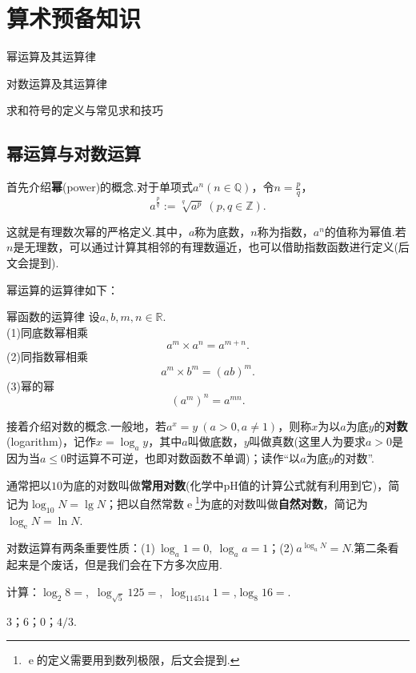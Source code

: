 \documentclass[lang=cn, zihao=5]{elegantbook}
\newcommand{\R}{\mathbb{R}}
\newcommand{\tk}{\uline{\hspace{4em}}}
\DeclareMathOperator{\ee}{e}
\begin{document}
\chapter{算术预备知识}

\begin{introduction}
	\item 幂运算及其运算律
	\item 对数运算及其运算律
	\item 求和符号的定义与常见求和技巧
\end{introduction}

\section{幂运算与对数运算}

首先介绍\textbf{幂}(power)的概念.对于单项式$a^n(n \in \mathbb{Q})$，令$n=\frac{p}{q}$，
$$a^{\frac{p}{q}}:=\sqrt[q]{a^p} \ (p,q \in \mathbb{Z}).$$

这就是有理数次幂的严格定义.其中，$a$称为底数，$n$称为指数，$a^n$的值称为幂值.若$n$是无理数，可以通过计算其相邻的有理数逼近，也可以借助指数函数进行定义(后文会提到).

幂运算的运算律如下：

\begin{proposition}{幂函数的运算律}
	设$a,b,m,n \in \R $. \\
	(1)同底数幂相乘$$a^m \times a^n = a^{m+n}.$$
	(2)同指数幂相乘$$a^m \times b^m = (ab)^m.$$
	(3)幂的幂$$(a^m)^n=a^{mn}.$$
\end{proposition}

接着介绍对数的概念.一般地，若$a^x=y~(a>0,a \neq 1)$，则称$x$为以$a$为底$y$的\textbf{对数}(logarithm)，记作$x = \log_{a}{y}$，其中$a$叫做底数，$y$叫做真数(这里人为要求$a>0$是因为当$a\leq 0$时运算不可逆，也即对数函数不单调)；读作“以$a$为底$y$的对数”.

通常把以$10$为底的对数叫做\textbf{常用对数}(化学中pH值的计算公式就有利用到它)，简记为$\log_{10}{N}=\lg N$；把以自然常数$\ee$\footnote{$\ee$的定义需要用到数列极限，后文会提到.}为底的对数叫做\textbf{自然对数}，简记为$\log_{\ee}{N}=\ln N$.

对数运算有两条重要性质：(1)$~\log_{a}{1} = 0,~\log_{a}{a}=1$；(2)$~a^{\log_{a}{N}}=N$.第二条看起来是个废话，但是我们会在下方多次应用.

\begin{example}
	计算：$\log_{2}{8}=$\tk ,~$\log_{\sqrt{5}}{125}=$\tk ,~$\log_{114514}{1}=$\tk ,$\log_{8}{16}=$\tk .
\end{example}
\begin{solution}
	$3$；$6$；$0$；$4/3$.
\end{solution}
\end{document}
